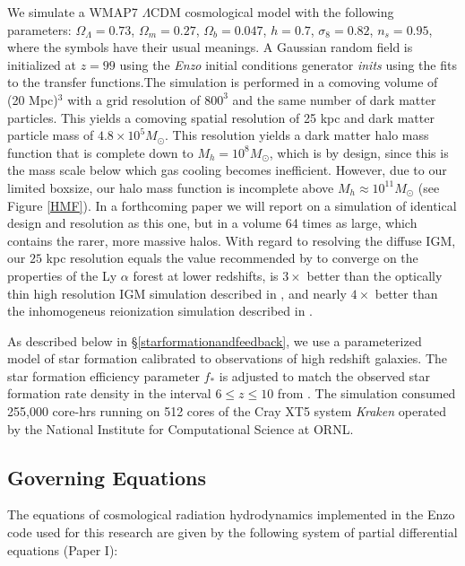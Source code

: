 We simulate a WMAP7 \citep{JarosikEtAl2011} $\Lambda$CDM cosmological model with the following parameters: 
$\Omega_{\Lambda} = 0.73$, $\Omega_m = 0.27$, $\Omega_b = 0.047$, 
$h = 0.7$, $\sigma_8 = 0.82$, $n_s = 0.95$, where the symbols have their usual meanings.  
A Gaussian random
field is initialized at $z=99$ using the {\em Enzo} initial conditions generator {\em inits} 
using the \cite{EisensteinHu1999} fits to the transfer functions.The simulation is performed in a comoving volume of (20 Mpc)$^3$ with a grid
resolution of $800^3$ and the same number of dark matter particles. This yields a comoving spatial resolution of 25 kpc and
dark matter particle mass of $4.8 \times 10^5 M_{\odot}$. This resolution yields a dark matter halo mass function that
is complete down to $M_h = 10^8 M_{\odot}$, which is by design, since this is the mass scale below 
which gas cooling becomes inefficient. However, due to our limited boxsize, our halo mass function is incomplete above 
$M_h \approx 10^{11} M_{\odot}$ (see Figure \ref{HMF}). In a forthcoming paper we will report on a simulation of identical design and resolution as this one, but in a volume 64 times as large, which contains the rarer, more massive halos. With regard to resolving the diffuse IGM, our $25$ kpc resolution equals the value recommended by \cite{BryanEtAl1999} to converge on the properties of the Ly $\alpha$ forest at lower redshifts, is $3\times$ better than the optically thin high resolution IGM simulation described in \cite{ShullEtAl2012}, and nearly $4\times$ better than the inhomogeneus reionization simulation described in \cite{TracEtAl2008}. 

As described below in \S\ref{starformationandfeedback}, we use a parameterized model of star formation calibrated to observations of high redshift galaxies. The star formation efficiency parameter $f_*$ is adjusted to match the observed star formation rate density in the interval $6 \leq z \leq 10$ from \cite{BouwensEtAl2011}.  
The simulation consumed 255,000 core-hrs running on 512 cores of the Cray XT5 system {\em Kraken} operated by the 
National Institute for Computational Science at ORNL. 

\subsection{Governing Equations}
\label{GoverningEquations}

The equations of cosmological radiation hydrodynamics implemented in the Enzo code used for this research are given by the following system of partial differential equations (Paper I):

